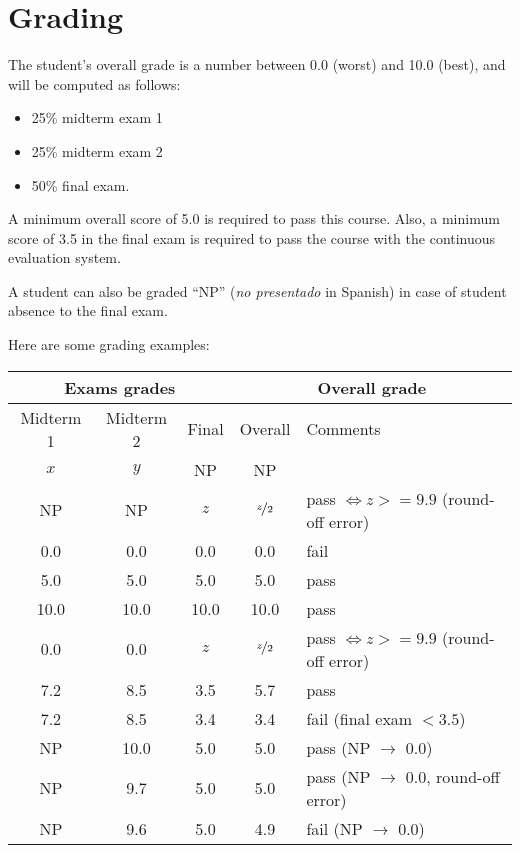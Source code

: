 \documentclass[11pt, a4paper, twoside]{article}
\begin{document}
\section{Grading}

The student's overall grade is a number between 0.0 (worst) and 10.0 (best),
and will be computed as follows:

\begin{itemize}

  \item 25\% midterm exam 1

  \item 25\% midterm exam 2

  \item 50\% final exam.

\end{itemize}

A minimum overall score of 5.0 is required to pass this course. Also,
a minimum score of 3.5 in the final exam is required to pass
the course with the continuous evaluation system.

A student can also be graded ``NP'' (\emph{no presentado} in Spanish) in case
of student absence to the final exam.

Here are some grading examples:

\begin{center}
  \begin{tabular}{|c|c|c||c|l|}
    \hline
    \multicolumn{3}{|c||}{Exams grades} & \multicolumn{2}{|c|}{Overall grade} \\
    \hline
    Midterm 1 & Midterm 2 & Final & Overall & Comments\\
    \hline
    $x$  & $y$  & NP   & NP   & \\
    NP   & NP   & $z$  & $\nicefrac{z}{2}$  & pass $\iff z >= 9.9$ (round-off error)\\
    \hline
    0.0  & 0.0  & 0.0  & 0.0  & fail \\
    5.0  & 5.0  & 5.0  & 5.0  & pass \\
    10.0 & 10.0 & 10.0 & 10.0 & pass \\
    \hline
    0.0  & 0.0  & $z$ & $\nicefrac{z}{2}$ & pass $\iff z >= 9.9$ (round-off error)\\
    \hline
    7.2  & 8.5  & 3.5  & 5.7  & pass \\
    7.2  & 8.5  & 3.4  & 3.4  & fail (final exam $< 3.5$) \\
    \hline
    NP   & 10.0 & 5.0  & 5.0  & pass (NP $\rightarrow$ 0.0) \\
    NP   & 9.7  & 5.0  & 5.0  & pass (NP $\rightarrow$ 0.0, round-off error) \\
    NP   & 9.6  & 5.0  & 4.9  & fail (NP $\rightarrow$ 0.0) \\
    \hline
  \end{tabular}
\end{center}
\end{document}
